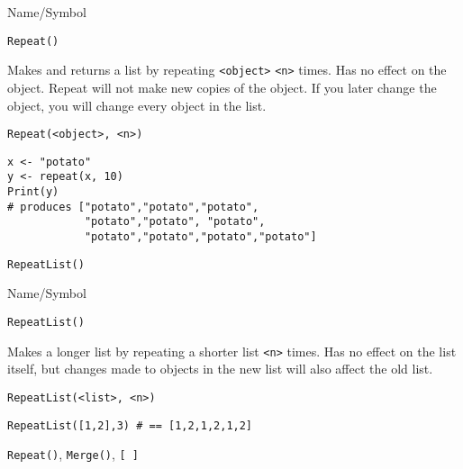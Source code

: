 \begin{desc}{Name/Symbol}
\item[Name/Symbol] 	\verb+Repeat()+

\item[Description] 	Makes and returns a list by repeating \verb+<object>+ \verb+<n>+ times. 
		Has no effect on the object. Repeat will not make new copies 
		of the object. If you later change the object, 
		you will change every object in the list.

\item[Usage]       	
\begin{verbatim}
Repeat(<object>, <n>)
\end{verbatim}
	    	
\item[Example]     	
\begin{verbatim}
x <- "potato"
y <- repeat(x, 10)
Print(y)
# produces ["potato","potato","potato",
            "potato","potato", "potato",
            "potato","potato","potato","potato"]
\end{verbatim}
	     	     
\item[See Also]    	\verb+RepeatList()+
\end{desc}

\begin{desc}{Name/Symbol}
\item[Name/Symbol] 	\verb+RepeatList()+

\item[Description]  	Makes a longer list by repeating a shorter list \verb+<n>+ times. 
	Has no effect on the list itself, but changes made to objects 
	in the new list will also affect the old list.

\item[Usage]       	
\begin{verbatim}
RepeatList(<list>, <n>)
\end{verbatim}

\item[Example]     	
\begin{verbatim}
RepeatList([1,2],3) # == [1,2,1,2,1,2]
\end{verbatim}

\item[See Also]    	\verb+Repeat()+, \verb+Merge()+, \verb+[ ]+
\end{desc}


